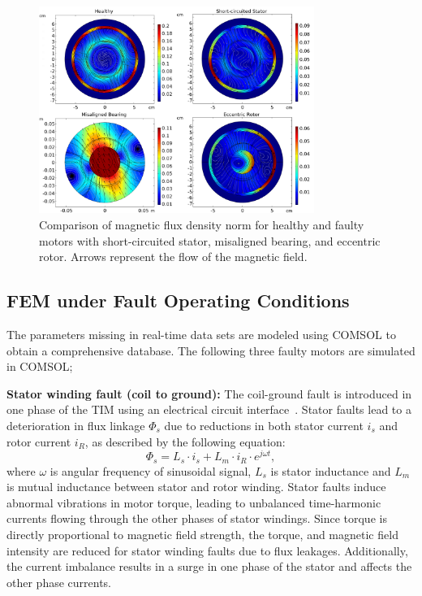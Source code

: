\documentclass[a4paper,conference]{IEEEtran}
\begin{document}
\begin{figure}[t!]
    \centering
    \includegraphics[width=0.8\textwidth]{ Figs/sp.png } 
    \caption{Comparison of magnetic flux density norm for healthy and faulty motors with short-circuited stator, misaligned bearing, and eccentric rotor. Arrows represent the flow of the magnetic field.}\label{fig:Torque}
\end{figure}



\subsection{FEM under Fault Operating Conditions}
The parameters missing in real-time data sets are modeled using COMSOL to obtain a comprehensive database. The following three faulty motors are simulated in COMSOL;

\textbf{Stator winding fault (coil to ground):} The coil-ground fault is introduced in one phase of the TIM using an electrical circuit interface~\cite{8778128}. Stator faults lead to a deterioration in flux linkage $\Phi_s$ due to reductions in both stator current $i_s$ and rotor current $i_R$, as described by the following equation:
\begin{equation}
\Phi_s = L_s \cdot i_s + L_m \cdot i_{R} \cdot e^{j\omega t},
\end{equation}
where $\omega$ is angular frequency of sinusoidal signal, $L_s$ is stator inductance and $L_m$ is mutual inductance between stator and rotor winding.
Stator faults induce abnormal vibrations in motor torque, leading to unbalanced time-harmonic currents flowing through the other phases of stator windings. Since torque is directly proportional to magnetic field strength, the torque, and magnetic field intensity are reduced for stator winding faults due to flux leakages. Additionally, the current imbalance results in a surge in one phase of the stator and affects the other phase currents.
\end{document}

